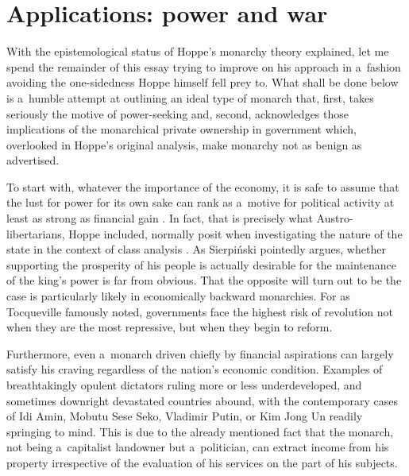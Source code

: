 \section{Applications: power and war}

With the epistemological status of Hoppe's monarchy theory explained, let me spend the remainder of this essay trying to improve on his approach in a~fashion avoiding the one-sidedness Hoppe himself fell prey to. What shall be done below is a~humble attempt at outlining an ideal type of monarch that, first, takes seriously the motive of power-seeking and, second, acknowledges those implications of the monarchical private ownership in government which, overlooked in Hoppe's original analysis, make monarchy not as benign as advertised.



To start with, whatever the importance of the economy, it is safe to assume that the lust for power for its own sake can rank as a~motive for political activity at least as strong as financial gain 
\parencite[][p.272]{nowakowski_dlaczego_2010}. %
 In fact, that is precisely what Austro-libertarians, Hoppe included, normally posit when investigating the nature of the state in the context of class analysis 
\parencites[][pp.117–138]{hoppe_economics_2006}[][pp.55–88]{rothbard_egalitarianism_2000}. %
 As Sierpiński 
\parencite*[][p.557]{sierpinski_critica_2016} %
 pointedly argues, whether supporting the prosperity of his people is actually desirable for the maintenance of the king's power is far from obvious. That the opposite will turn out to be the case is particularly likely in economically backward monarchies. For as Tocqueville 
\parencite*[][]{tocqueville_old_1955} %
 famously noted, governments face the highest risk of revolution not when they are the most repressive, but when they begin to reform.



Furthermore, even a~monarch driven chiefly by financial aspirations can largely satisfy his craving regardless of the nation's economic condition. Examples of breathtakingly opulent dictators ruling more or less underdeveloped, and sometimes downright devastated countries abound, with the contemporary cases of Idi Amin, Mobutu Sese Seko, Vladimir Putin, or Kim Jong Un readily springing to mind. This is due to the already mentioned fact that the monarch, not being a~capitalist landowner but a~politician, can extract income from his property irrespective of the evaluation of his services on the part of his subjects.



